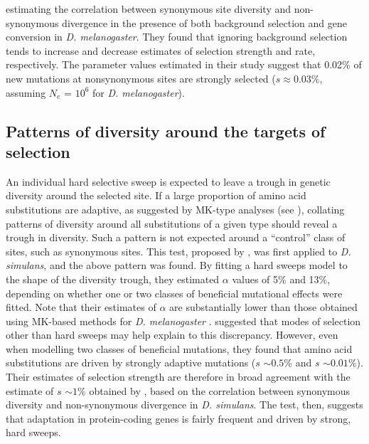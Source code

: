 estimating the correlation between synonymous site diversity and non-synonymous divergence in the presence of both background selection and gene conversion in \textit{D. melanogaster}. They found that ignoring background selection tends to increase and decrease estimates of selection strength and rate, respectively. The parameter values estimated in their study suggest that 0.02\% of new mutations at nonsynonymous sites are strongly selected ($s \approx 0.03\%$, assuming $N_e$ = $10^6$ for \textit{D. melanogaster}).
 
\subsection[Patterns of diversity around the targets of selection]{Patterns of diversity around the targets of selection}
 
An individual hard selective sweep is expected to leave a trough in genetic diversity around the selected site. If a large proportion of amino acid substitutions are adaptive, as suggested by MK-type analyses (see \citealt{RN215}), collating patterns of diversity around all substitutions of a given type should reveal a trough in diversity. Such a pattern is not expected around a ``control'' class of sites, such as synonymous sites. This test, proposed by \cite{RN167}, was first applied  to \textit{D. simulans}, and the above pattern was found. By fitting a hard sweeps model to the shape of the diversity trough, they estimated $\alpha$ values of  5\% and 13\%, depending on whether one or two classes of beneficial mutational effects were fitted. Note that their estimates of $\alpha$ are substantially lower than those obtained using MK-based methods for \textit{D. melanogaster} \citealt{RN283}. \cite{RN167} suggested that modes of selection other than hard sweeps may help explain to this discrepancy. However, even when modelling two classes of beneficial mutations, they found that amino acid substitutions are driven by strongly adaptive mutations ($s$ $\sim0.5\%$ and $s$ $\sim0.01\%$). Their estimates of selection strength are therefore in broad agreement with the estimate of $s$ $\sim1\%$ obtained by \cite{RN289}, based on the correlation between synonymous diversity and non-synonymous divergence in \textit{D. simulans}. The \cite{RN167} test, then, suggests that adaptation in protein-coding genes is fairly frequent and driven by strong, hard sweeps.
 
